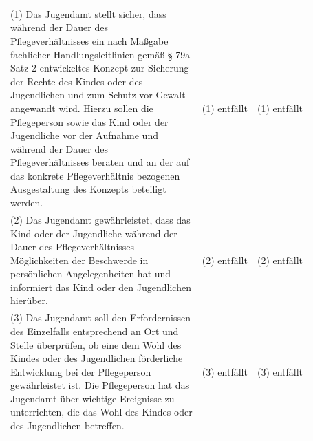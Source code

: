 \documentclass[10pt,a4paper,landscape]{article}
\begin{document}
\begin{longtable}{|L{8.2cm}|L{8.2cm}|L{8.2cm}|}
(1) \textcolor{diffred}{Das Jugendamt stellt sicher, dass  \newline während der Dauer des    \newline Pflegeverhältnisses ein nach Maßgabe  \newline fachlicher Handlungsleitlinien gemäß \S{} 79a  \newline Satz 2 entwickeltes Konzept zur Sicherung  \newline der Rechte des Kindes oder des  \newline Jugendlichen und zum Schutz vor Gewalt  \newline angewandt wird. Hierzu sollen die  \newline Pflegeperson sowie das Kind oder der  \newline Jugendliche vor der Aufnahme und  \newline während der Dauer des  \newline Pflegeverhältnisses beraten und an der auf  \newline das konkrete Pflegeverhältnis bezogenen  \newline Ausgestaltung des Konzepts beteiligt  \newline werden.} & (1) entfällt & (1) entfällt \\
\hhline{|---|}
(2) \textcolor{diffred}{Das Jugendamt gewährleistet, dass das  \newline Kind oder der Jugendliche während der  \newline Dauer des Pflegeverhältnisses  \newline Möglichkeiten der Beschwerde in  \newline persönlichen Angelegenheiten hat und  \newline informiert das Kind oder den Jugendlichen  \newline hierüber.} & (2) entfällt & (2) entfällt \\
\hhline{|---|}
(3) \textcolor{diffred}{Das Jugendamt soll den Erfordernissen  \newline des Einzelfalls entsprechend an Ort und  \newline Stelle überprüfen, ob eine dem Wohl des  \newline Kindes oder des Jugendlichen förderliche  \newline Entwicklung bei der Pflegeperson  \newline gewährleistet ist. Die Pflegeperson hat das  \newline Jugendamt über wichtige Ereignisse zu  \newline unterrichten, die das Wohl des Kindes oder  \newline des Jugendlichen betreffen.} & (3) entfällt & (3) entfällt \\

\end{longtable}
\end{document}
